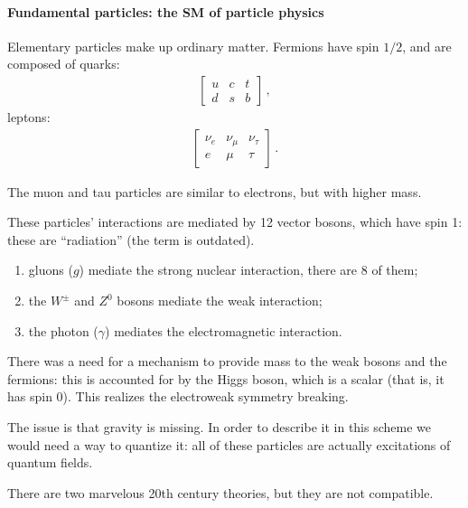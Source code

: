 \documentclass[main.tex]{subfiles}
\begin{document}
\paragraph{Fundamental particles: the SM of particle physics}

Elementary particles make up ordinary matter. 
Fermions have spin \(1/2\), and are composed of quarks: 
%
\begin{subequations}
\begin{align}
\left[\begin{array}{ccc}
u & c & t \\ 
d & s & b
\end{array}\right]
\,,
\end{align}
\end{subequations}
%
leptons: 
%
\begin{subequations}
\begin{align}
\left[\begin{array}{ccc}
\nu_{e} & \nu_{\mu } & \nu_{\tau } \\ 
e & \mu  & \tau 
\end{array}\right]
\,.
\end{align}
\end{subequations}

The muon and tau particles are similar to electrons, but with higher mass. 

These particles' interactions are mediated by 12
vector bosons, which have spin 1: these are ``radiation'' (the term is outdated).

\begin{enumerate}
  \item gluons (\(g\)) mediate the strong nuclear interaction, there are 8 of them;
  \item the \(W^{\pm}\) and \(Z^{0}\) bosons mediate the weak interaction;
  \item the photon (\(\gamma \)) mediates the electromagnetic interaction. 
\end{enumerate}

There was a need for a mechanism to provide mass to the weak bosons and the fermions: this is accounted for by the Higgs boson, which is a scalar (that is, it has spin 0). 
This realizes the electroweak symmetry breaking.

The issue is that gravity is missing.
In order to describe it in this scheme we would need a way to quantize it: all of these particles are actually excitations of quantum fields. 

There are two marvelous 20th century theories, but they are not compatible. 
\end{document}
